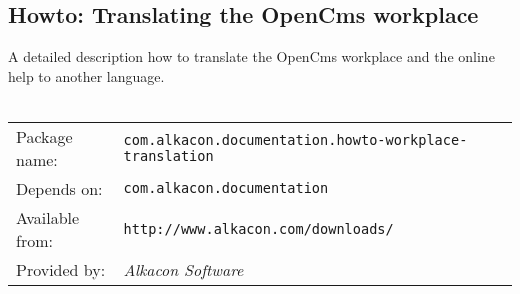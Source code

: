 \subsection{Howto: Translating the OpenCms workplace}
A detailed description how to translate the OpenCms workplace and the online help to another language.
\\
\\
\begin{tabular}{ll}
Package name: & {\tt com.alkacon.documentation.howto-workplace-translation}\\
Depends on: & {\tt com.alkacon.documentation}\\
Available from: & {\tt http://www.alkacon.com/downloads/}\\
Provided by: & {\em Alkacon Software}\\
\end{tabular}
